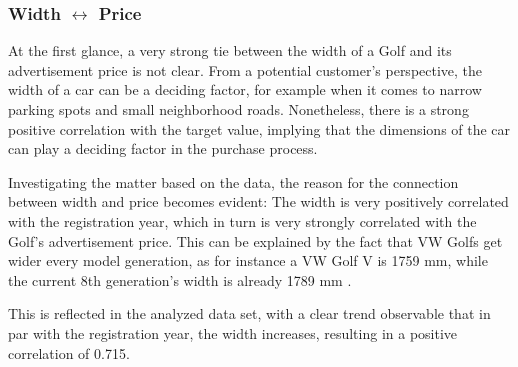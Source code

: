 \subsubsection{Width $\leftrightarrow$ Price}
At the first glance, a very strong tie between the width of a Golf and its advertisement price is not clear.
From a potential customer's perspective, the width of a car can be a deciding factor, for example when it comes to
narrow parking spots and small neighborhood roads.
Nonetheless, there is a strong positive correlation with the target value, implying that the dimensions of the car
can play a deciding factor in the purchase process.
\par
Investigating the matter based on the data, the reason for the connection between width and price becomes evident:
The width is very positively correlated with the registration year, which in turn is very strongly correlated with the Golf's advertisement price.
This can be explained by the fact that VW Golfs get wider every model generation, as for instance a VW Golf V is 1759 mm,
while the current 8th generation's width is already 1789 mm \autocite{VolkswagenGolfTechnical}.
\par
This is reflected in the analyzed data set, with a clear trend observable that in par with the registration year, the width increases,
resulting in a positive correlation of 0.715.

